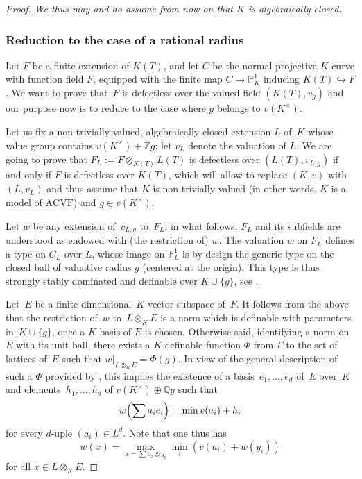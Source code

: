 \documentclass[JEP,XML,SOM,Unicode,ThmDefs,NoEqCountersInSection,published]{cedram}
\newcommand{\acvf}{\mathrm{ACVF}}
\renewcommand{\P}{\mathbb P}
\newcommand{\Q}{\mathbb Q}
\newcommand{\Z}{\mathbb Z}
\theoremstyle{plain}
\theoremstyle{definition}
\begin{document}
\begin{proof}
\textit{We thus may and do assume from now on that $K$ is algebraically closed}.

\subsubsection{Reduction to the case of
a rational radius}
\label{subsubsection-rational-radius}
Let $F$ be a finite extension of $K(T)$,
and let
$C$ be the normal projective $K$-curve
with function field $F$, equipped with
the finite map $C\to \P^1_K$ inducing $K(T)\hookrightarrow F$.
We want to prove that~$F$
is defectless over the valued
field $(K(T),v_g)$ and our purpose now is
to reduce to the case where $g$ belongs to $v(K^\times)$.

Let us fix a non-trivially valued, algebraically closed extension $L$ of~$K$ whose
value group contains
$v(K^\times)+\Z g$; let $v_L$ denote the valuation of $L$.
We are going to prove that $F_L:=F\otimes_{K(T)}L(T)$
is defectless over $(L(T),v_{L,g})$
if and only if $F$ is defectless over $K(T)$, which will allow
to replace $(K,v)$ with $(L,v_L)$ and thus assume that
$K$ is non-trivially valued (in other words, $K$
is a model of $\acvf$) and $g\in v(K^\times)$.

Let $w$ be any extension of~$v_{L,g}$ to~$F_L$;
in what follows, $F_L$ and its subfields are understood as endowed with (the restriction of) $w$.
The valuation $w$ on $F_L$ defines a type on $C_L$ over $L$, whose image on $\P^1_L$ is by design
the generic type on the closed ball of valuative radius $g$ (centered at the origin). This type is thus strongly
stably dominated and definable over $K\cup\{g\}$, see \cite[Prop.\,8.1.2]{HL}.

Let~$E$ be a finite dimensional~$K$-vector subspace of~$F$.
It follows from the above that the restriction of~$w$ to~$L\otimes_K E$ is a norm which is definable with parameters
in~$K\cup\{g\}$, once a $K$-basis of $E$ is chosen.
Otherwise said, identifying a norm on $E$ with its unit ball, there exists a $K$-definable function $\Phi$ from
$\Gamma$ to the set of lattices of~$E$ such that $w|_{L\otimes_KE}=\Phi(g)$. In view of the general description of such a
$\Phi$
provided by \cite[Lem.\,6.2.2]{HL}, this implies the existence of a basis~$e_1,\ldots, e_d$ of~$E$ over~$K$
and elements~$h_1,\ldots, h_d$ of
$v(K^\times)\oplus \Q g$ such
that
\begin{equation}\label{eq:1}
w\Bigl(\sum a_i e_i\Bigr)=\min v(a_i)+h_i
\end{equation}
for every $d$-uple
$(a_i)\in L^d$.
Note that one thus has
\begin{equation}\label{eq:2}
w(x)=\max_{x=\sum a_i\otimes y_i}\min_i (v(a_i)+w(y_i))
\end{equation}
for all $x\in L\otimes_K E$.


\end{proof}
\end{document}
